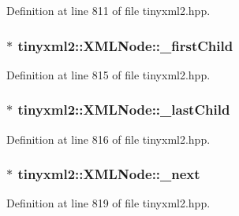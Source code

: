 Definition at line 811 of file tinyxml2.\-hpp.

\hypertarget{classtinyxml2_1_1_x_m_l_node_aa20c91e4213dc930c5bdf420322ca342}{
\subsubsection[{\-\_\-first\-Child}]{$\ast$ tinyxml2\-::\-X\-M\-L\-Node\-::\-\_\-first\-Child\hspace{0.3cm}{\ttfamily [protected]}}}\label{classtinyxml2_1_1_x_m_l_node_aa20c91e4213dc930c5bdf420322ca342}


Definition at line 815 of file tinyxml2.\-hpp.

\hypertarget{classtinyxml2_1_1_x_m_l_node_a099b6560ae44ab9edb8453aaf1a3747b}{
\subsubsection[{\-\_\-last\-Child}]{$\ast$ tinyxml2\-::\-X\-M\-L\-Node\-::\-\_\-last\-Child\hspace{0.3cm}{\ttfamily [protected]}}}\label{classtinyxml2_1_1_x_m_l_node_a099b6560ae44ab9edb8453aaf1a3747b}


Definition at line 816 of file tinyxml2.\-hpp.

\hypertarget{classtinyxml2_1_1_x_m_l_node_a27e985496b37dd00eb5b9cf59b9e3fb1}{
\subsubsection[{\-\_\-next}]{$\ast$ tinyxml2\-::\-X\-M\-L\-Node\-::\-\_\-next\hspace{0.3cm}{\ttfamily [protected]}}}\label{classtinyxml2_1_1_x_m_l_node_a27e985496b37dd00eb5b9cf59b9e3fb1}


Definition at line 819 of file tinyxml2.\-hpp.

